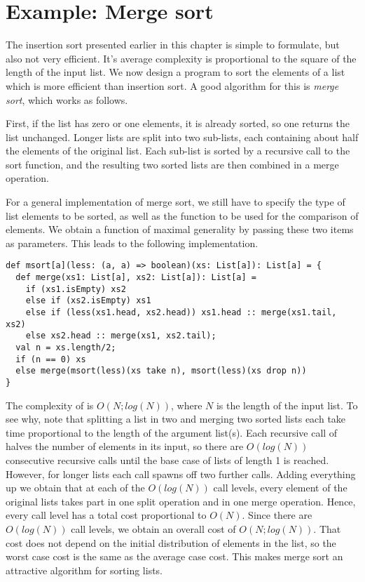 \section{Example: Merge sort}

The insertion sort presented earlier in this chapter is simple to
formulate, but also not very efficient. It's average complexity is
proportional to the square of the length of the input list. We now
design a program to sort the elements of a list which is more
efficient than insertion sort. A good algorithm for this is {\em merge
sort}, which works as follows.

First, if the list has zero or one elements, it is already sorted, so
one returns the list unchanged. Longer lists are split into two
sub-lists, each containing about half the elements of the original
list. Each sub-list is sorted by a recursive call to the sort
function, and the resulting two sorted lists are then combined in a
merge operation.

For a general implementation of merge sort, we still have to specify
the type of list elements to be sorted, as well as the function to be
used for the comparison of elements. We obtain a function of maximal
generality by passing these two items as parameters. This leads to the
following implementation.
\begin{lstlisting}
def msort[a](less: (a, a) => boolean)(xs: List[a]): List[a] = {
  def merge(xs1: List[a], xs2: List[a]): List[a] = 
    if (xs1.isEmpty) xs2
    else if (xs2.isEmpty) xs1
    else if (less(xs1.head, xs2.head)) xs1.head :: merge(xs1.tail, xs2)
    else xs2.head :: merge(xs1, xs2.tail);
  val n = xs.length/2;
  if (n == 0) xs
  else merge(msort(less)(xs take n), msort(less)(xs drop n))
}
\end{lstlisting}
The complexity of  is $O(N;log(N))$, where $N$ is the
length of the input list. To see why, note that splitting a list in
two and merging two sorted lists each take time proportional to the
length of the argument list(s). Each recursive call of 
halves the number of elements in its input, so there are $O(log(N))$
consecutive recursive calls until the base case of lists of length 1
is reached.  However, for longer lists each call spawns off two
further calls. Adding everything up we obtain that at each of the
$O(log(N))$ call levels, every element of the original lists takes
part in one split operation and in one merge operation. Hence, every
call level has a total cost proportional to $O(N)$. Since there are
$O(log(N))$ call levels, we obtain an overall cost of
$O(N;log(N))$. That cost does not depend on the initial distribution
of elements in the list, so the worst case cost is the same as the
average case cost. This makes merge sort an attractive algorithm for
sorting lists.

